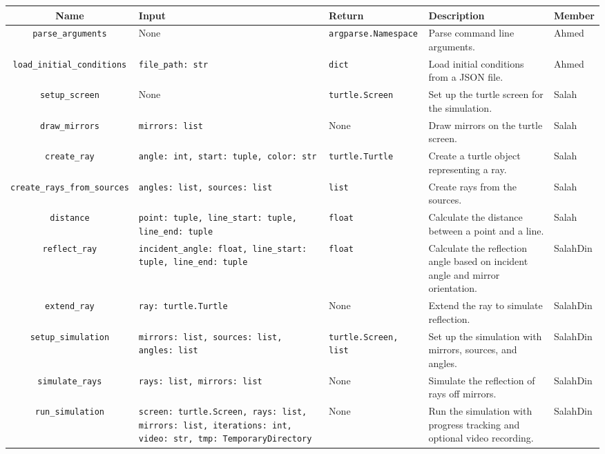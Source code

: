 \documentclass{article}
\begin{document}
\begin{longtable}{c|p{3.3cm}|p{3.3cm}|p{3cm}|p{1.25cm}}
  \bf Name & \bf Input & \bf Return & \bf Description & \bf Member \\
  \hline
  \texttt{parse\_arguments} & None & \texttt{argparse.Namespace} & Parse
  command line arguments. & Ahmed \\
  \hline
  \texttt{load\_initial\_conditions} & \texttt{file\_path: str} & \texttt{dict} & Load initial conditions from a JSON file. & Ahmed \\
  \hline
  \texttt{setup\_screen} & None & \texttt{turtle.Screen} & Set up the turtle
  screen for the simulation. & Salah \\
  \hline
  \texttt{draw\_mirrors} & \texttt{mirrors: list} & None & Draw mirrors on the turtle screen. & Salah \\
  \hline
  \texttt{create\_ray} & \texttt{angle: int, start: tuple, color: str} &
  \texttt{turtle.Turtle} & Create a turtle object representing a ray. &
  Salah \\
  \hline
  \texttt{create\_rays\_from\_sources} & \texttt{angles: list, sources:
  list} & \texttt{list} & Create rays from the sources. & Salah \\
  \hline
  \texttt{distance} & \texttt{point: tuple, line\_start: tuple, line\_end:
  tuple} & \texttt{float} & Calculate the distance between a point and a
  line. & Salah \\
  \hline
  \texttt{reflect\_ray} & \texttt{incident\_angle: float, line\_start:
  tuple, line\_end: tuple} & \texttt{float} & Calculate the reflection angle
  based on incident angle and mirror orientation. & SalahDin \\
  \hline
  \texttt{extend\_ray} & \texttt{ray: turtle.Turtle} & None & Extend the ray
  to simulate reflection. & SalahDin \\
  \hline
  \texttt{setup\_simulation} & \texttt{mirrors: list, sources: list, angles:
  list} & \texttt{turtle.Screen, list} & Set up the simulation with mirrors,
  sources, and angles. & SalahDin \\
  \hline
  \texttt{simulate\_rays} & \texttt{rays: list, mirrors: list} & None &
  Simulate the reflection of rays off mirrors. & SalahDin \\
  \hline
  \texttt{run\_simulation} & \texttt{screen: turtle.Screen, rays: list,
  mirrors: list, iterations: int, video: str, tmp: TemporaryDirectory} &
  None & Run the simulation with progress tracking and optional video
  recording. & SalahDin \\

\end{longtable}
\end{document}
